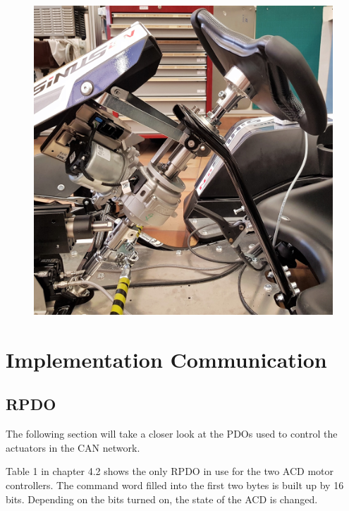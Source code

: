 \begin{figure}[h]
	\centering
	\includegraphics[width=0.7\linewidth]{pictures_figures/Used/picture_powersteering}
	\caption{}
	\label{fig:picturepowersteering}
\end{figure}

\section{Implementation Communication}

\subsection{RPDO}

The following section will take a closer look at the PDOs used to control the actuators in the CAN network.

Table 1 in chapter 4.2 shows the only RPDO in use for the two ACD motor controllers. The command word filled into the first two bytes is built up by 16 bits. Depending on the bits turned on, the state of the ACD is changed.

